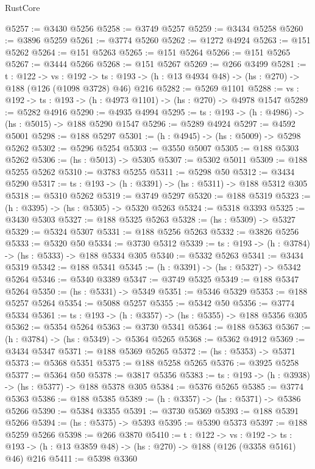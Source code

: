 \begin{lexlean}{RustCore}
\begin{coremodule}
@5257 := @3430 @5256
@5258 := @3749 @5257
@5259 := @3434 @5258
@5260 := @3896 @5259
@5261 := @3774 @5260
@5262 := @1272 @4924
@5263 := @151 @5262
@5264 := @151 @5263
@5265 := @151 @5264
@5266 := @151 @5265
@5267 := @3444 @5266
@5268 := @151 @5267
@5269 := @266 @3499
@5281 := {t : @122} ->
  {vs : @192} ->
  {ts : @193} -> (h : @13 @4934 @48) -> (hs : @270) -> @188 (@126 (@1098 @3728) @46) @216
@5282 := @5269 @1101
@5288 := {vs : @192} -> {ts : @193} -> (h : @4973 @1101) -> (hs : @270) -> @4978 @1547
@5289 := @5282 @4916
@5290 := @4935 @4994
@5295 := {ts : @193} -> (h : @4986) -> (hs : @5015) -> @188 @5290 @1547
@5296 := @5289 @4924
@5297 := @4592 @5001
@5298 := @188 @5297
@5301 := (h : @4945) -> (hs : @5009) -> @5298 @5262
@5302 := @5296 @5254
@5303 := @3550 @5007
@5305 := @188 @5303 @5262
@5306 := (hs : @5013) -> @5305
@5307 := @5302 @5011
@5309 := @188 @5255 @5262
@5310 := @3783 @5255
@5311 := @5298 @50
@5312 := @3434 @5290
@5317 := {ts : @193} -> (h : @3391) -> (hs : @5311) -> @188 @5312 @305
@5318 := @5310 @5262
@5319 := @3749 @5297
@5320 := @188 @5319
@5323 := (h : @3395) -> (hs : @5305) -> @5320 @5263
@5324 := @5318 @3393
@5325 := @3430 @5303
@5327 := @188 @5325 @5263
@5328 := (hs : @5309) -> @5327
@5329 := @5324 @5307
@5331 := @188 @5256 @5263
@5332 := @3826 @5256
@5333 := @5320 @50
@5334 := @3730 @5312
@5339 := {ts : @193} -> (h : @3784) -> (hs : @5333) -> @188 @5334 @305
@5340 := @5332 @5263
@5341 := @3434 @5319
@5342 := @188 @5341
@5345 := (h : @3391) -> (hs : @5327) -> @5342 @5264
@5346 := @5340 @3389
@5347 := @3749 @5325
@5349 := @188 @5347 @5264
@5350 := (hs : @5331) -> @5349
@5351 := @5346 @5329
@5353 := @188 @5257 @5264
@5354 := @5088 @5257
@5355 := @5342 @50
@5356 := @3774 @5334
@5361 := {ts : @193} -> (h : @3357) -> (hs : @5355) -> @188 @5356 @305
@5362 := @5354 @5264
@5363 := @3730 @5341
@5364 := @188 @5363
@5367 := (h : @3784) -> (hs : @5349) -> @5364 @5265
@5368 := @5362 @4912
@5369 := @3434 @5347
@5371 := @188 @5369 @5265
@5372 := (hs : @5353) -> @5371
@5373 := @5368 @5351
@5375 := @188 @5258 @5265
@5376 := @3925 @5258
@5377 := @5364 @50
@5378 := @3817 @5356
@5383 := {ts : @193} -> (h : @3938) -> (hs : @5377) -> @188 @5378 @305
@5384 := @5376 @5265
@5385 := @3774 @5363
@5386 := @188 @5385
@5389 := (h : @3357) -> (hs : @5371) -> @5386 @5266
@5390 := @5384 @3355
@5391 := @3730 @5369
@5393 := @188 @5391 @5266
@5394 := (hs : @5375) -> @5393
@5395 := @5390 @5373
@5397 := @188 @5259 @5266
@5398 := @266 @3870
@5410 := {t : @122} ->
  {vs : @192} ->
  {ts : @193} -> (h : @13 @3859 @48) -> (hs : @270) -> @188 (@126 (@3358 @5161) @46) @216
@5411 := @5398 @3360

\end{coremodule}
\end{lexlean}
